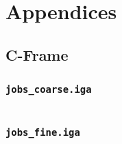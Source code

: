\documentclass[12pt,report,justified]{SANDreport}
\begin{document}
% 
% 
% 
% 
% 

\appendix
\chapter{Appendices}

\section{C-Frame}

\subsection{\tt{jobs\_coarse.iga}}
\inputminted[stripnl=false]{json}{cframe_modal/jobs_coarse.json}

\subsection{\tt{jobs\_fine.iga}}
\inputminted[stripnl=false]{json}{cframe_modal/jobs_fine.json}
\end{document}
